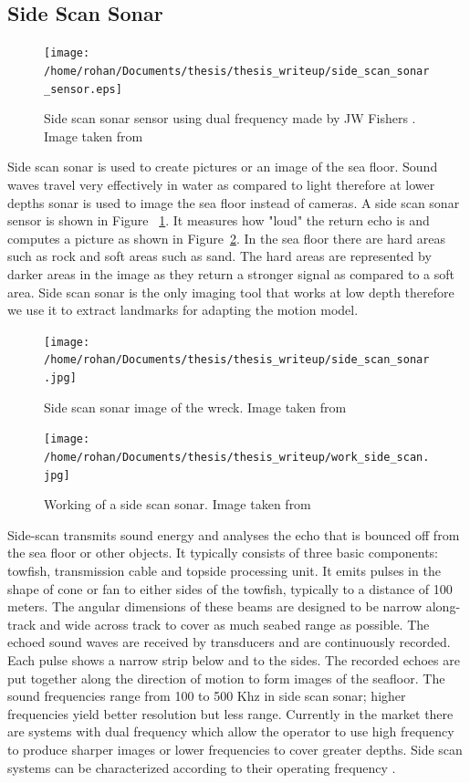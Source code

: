 \documentclass[12pt]{dalcsthesis}
\begin{document}
\subsection{Side Scan Sonar} 
\begin{figure}[!ht]
  \centering
     {\texttt{[image: /home/rohan/Documents/thesis/thesis\_writeup/side\_scan\_sonar\_sensor.eps]}}
  \caption{\label{fig- side scan sonar sensor} Side scan sonar sensor using dual frequency made by JW Fishers . Image taken from \cite{side_sonar_fisheries_url}}
\end{figure}
Side scan sonar is used to create pictures or an image of the sea floor. Sound waves travel very effectively in water as compared to light therefore at lower depths sonar is used to image the sea floor instead of cameras. A side scan sonar sensor is shown in Figure ~\ref{fig- side scan sonar sensor}. It measures how "loud" the return echo is and computes a picture as shown in Figure~\ref{fig- side scan sonar image}. In the sea floor there are hard areas such as rock and soft areas such as sand. The hard areas are represented by darker areas in the image as they return a stronger signal as compared to a soft area. Side scan sonar is the only imaging tool that works at low depth therefore we use it to extract landmarks for adapting the motion model. 

\begin{figure}[!ht]
  \centering
     {\texttt{[image: /home/rohan/Documents/thesis/thesis\_writeup/side\_scan\_sonar.jpg]}}
  \caption{\label{fig- side scan sonar image} Side scan sonar image of the wreck. Image taken from \cite{side_sonar_url}}
\end{figure}

\begin{figure}[!ht]
  \centering
     {\texttt{[image: /home/rohan/Documents/thesis/thesis\_writeup/work\_side\_scan.jpg]}}
  \caption{\label{fig- side scan sonar working} Working of a side scan sonar. Image taken from \cite{side_sonar_url}}
\end{figure}

Side-scan transmits sound energy and analyses the echo that is bounced off from the sea floor or other objects. It typically consists of three basic components: towfish, transmission cable and topside processing unit. It emits pulses in the shape of cone or fan to either sides of the towfish, typically to a distance of 100 meters. The angular dimensions of these beams are designed to be narrow along-track and wide across track to cover as much seabed range as possible.  The echoed sound waves are received by transducers and are continuously recorded. Each pulse shows a narrow strip below and to the sides.  The recorded echoes are put together along the direction of motion to form images of the seafloor. The sound frequencies range from 100 to 500 Khz in side scan sonar; higher frequencies yield better resolution but less range. Currently in the market there are systems with dual frequency which allow the operator to use high frequency to produce sharper images or lower frequencies to cover greater depths. 
Side scan 
systems can be characterized according to their operating frequency \cite{side_sonar_usgs_url}.
\end{document}
